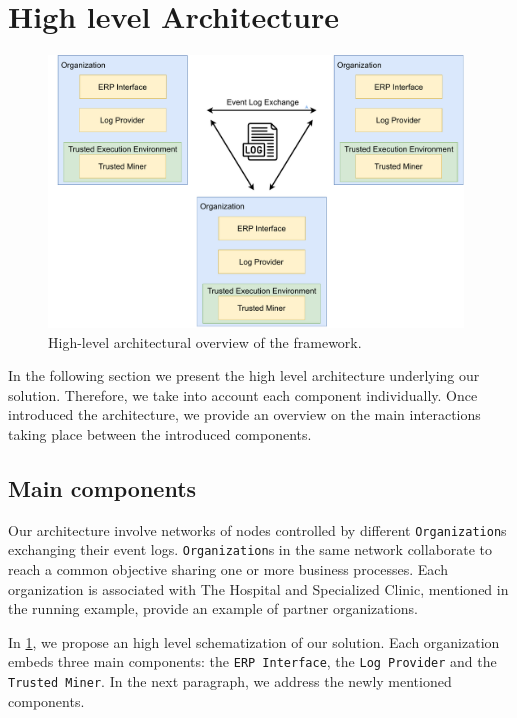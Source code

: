 \section{High level Architecture}
\label{fig:architecture_diagram}
\begin{figure}[t]
\centering
\includegraphics[width=11cm]{content/figures/architecture_diagram.pdf}
\caption{High-level architectural overview of the framework.}
\label{fig:implementation}
\end{figure}
In the following section we present the high level architecture underlying our solution. Therefore, we take into account each component individually. Once introduced the architecture, we provide an overview on the main interactions taking place between the introduced components.
\subsection{Main components}
Our architecture involve networks of nodes controlled by different \texttt{Organization}s exchanging their event logs. \texttt{Organization}s in the same network collaborate to reach a common objective sharing one or more business processes. Each organization is associated with  The Hospital and Specialized Clinic, mentioned in the running example, provide an example of partner organizations.

In \cref{fig:architecture_diagram}, we propose an high level schematization of our solution. Each organization embeds three main components: the \texttt{ERP Interface}, the \texttt{Log Provider} and the \texttt{Trusted Miner}. %
In the next paragraph, we address the newly mentioned components.
